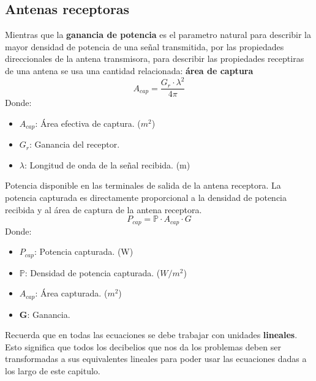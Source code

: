 \documentclass[
	12pt, %
	fleqn, %
	a4paper, %
	oneside, %
]{LegrandOrangeBook}
\begin{document}
\subsection{Antenas receptoras}
\begin{definition}
Mientras que la \textbf{ganancia de potencia} es el parametro natural para describir la mayor densidad de potencia de una señal transmitida, por las propiedades direccionales de la antena transmisora, para describir las propiedades receptiras de una antena se usa una cantidad relacionada: \textbf{área de captura}
\begin{equation}
A_{cap}=\frac{G_r\cdot\lambda^2}{4\pi}
\label{eq:area capturada}
\end{equation}
Donde:
\begin{itemize}
\item $A_{cap}$: Área efectiva de captura. ($m^2$)
\item $G_r$: Ganancia del receptor.
\item $\lambda$: Longitud de onda de la señal recibida. (m)
\end{itemize}
\end{definition}
\begin{definition}
Potencia disponible en las terminales de salida de la antena receptora. La potencia capturada es directamente proporcional a la densidad de potencia recibida y al área de captura de la antena receptora.
\begin{equation}
P_{cap}=\mathbb{P}\cdot A_{cap}\cdot G
\label{eq:potencia capturada}
\end{equation}
Donde:
\begin{itemize}
\item $P_{cap}$: Potencia capturada. (W)
\item $\mathbb{P}$: Densidad de potencia capturada. ($W/m^2$)
\item $A_{cap}$: Área capturada. ($m^2$)
\item \textbf{G}: Ganancia.
\end{itemize}
\end{definition}
\begin{remark}
Recuerda que en todas las ecuaciones se debe trabajar con unidades \textbf{lineales}. Esto significa que todos los decibelios que nos da los problemas deben ser transformadas a sus equivalentes lineales para poder usar las ecuaciones dadas a los largo de este capitulo.
\end{remark}
\end{document}
